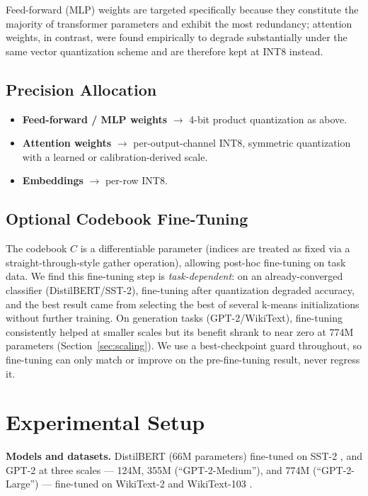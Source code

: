 \documentclass[11pt]{article}
\begin{document}
Feed-forward (MLP) weights are targeted specifically because they
constitute the majority of transformer parameters and exhibit the most
redundancy; attention weights, in contrast, were found empirically to
degrade substantially under the same vector quantization scheme and are
therefore kept at INT8 instead.

\subsection{Precision Allocation}

\begin{itemize}
  \item \textbf{Feed-forward / MLP weights} $\rightarrow$ 4-bit product
    quantization as above.
  \item \textbf{Attention weights} $\rightarrow$ per-output-channel INT8,
    symmetric quantization with a learned or calibration-derived scale.
  \item \textbf{Embeddings} $\rightarrow$ per-row INT8.
\end{itemize}

\subsection{Optional Codebook Fine-Tuning}

The codebook $C$ is a differentiable parameter (indices are treated as
fixed via a straight-through-style gather operation), allowing post-hoc
fine-tuning on task data. We find this fine-tuning step is
\emph{task-dependent}: on an already-converged classifier (DistilBERT/SST-2),
fine-tuning after quantization degraded accuracy, and the best result came
from selecting the best of several k-means initializations without further
training. On generation tasks (GPT-2/WikiText), fine-tuning consistently
helped at smaller scales but its benefit shrank to near zero at 774M
parameters (Section~\ref{sec:scaling}). We use a best-checkpoint guard
throughout, so fine-tuning can only match or improve on the pre-fine-tuning
result, never regress it.

\section{Experimental Setup}

\textbf{Models and datasets.} DistilBERT (66M parameters) fine-tuned on
SST-2 \citep{socher2013sst2}, and GPT-2 at three scales --- 124M, 355M
(``GPT-2-Medium''), and 774M (``GPT-2-Large'') \citep{radford2019gpt2}
--- fine-tuned on WikiText-2 and WikiText-103 \citep{merity2017wikitext}.
\end{document}
